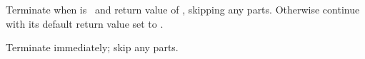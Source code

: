 \begin{LIST}{1cm}
\begin{LIST}{.5cm}
    {
    Terminate  when  is \T\ and return value of
    , skipping any  parts. Otherwise continue
     with its default return value set to \NIL. 
    }

    {
    Terminate  immediately; skip any  parts.
    }
  \end{LIST}
\end{LIST}





